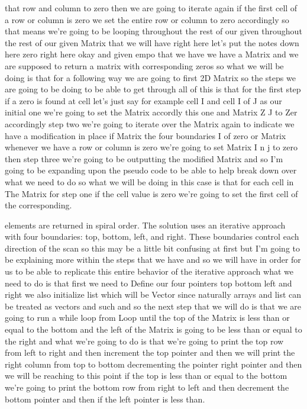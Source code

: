 \expandafter\def\csname sourceexcerpt@58\endcsname{%
that row and column to zero then we are going to iterate again if the first cell of a
row or column is zero we set the entire row or column to zero accordingly so that
means we're going to be looping throughout the rest of our given throughout the rest
of our given Matrix that we will have right here let's put the notes down here zero
right here okay and given empo that we have we have a Matrix and we are supposed to
return a matrix with corresponding zeros so what we will be doing is that for a
following way we are going to first 2D Matrix so the steps we are going to be doing to
be able to get through all of this is that for the first step if a zero is found at
cell let's just say for example cell I and cell I of J as our initial one we're going
to set the Matrix accordly this one and Matrix Z J to Zer accordingly step two we're
going to iterate over the Matrix again to indicate we have a modification in place if
Matrix the four boundaries I of zero or Matrix whenever we have a row or column is zero we're
going to set Matrix I n j to zero then step three we're going to be outputting the
modified Matrix and so I'm going to be expanding upon the pseudo code to be able to
help break down over what we need to do so what we will be doing in this case is that
for each cell in The Matrix for step one if the cell value is zero we're going to set
the first cell of the corresponding.
}

\expandafter\def\csname sourceexcerpt@59\endcsname{%
elements are returned in spiral order. The solution uses an iterative approach with
four boundaries: top, bottom, left, and right. These boundaries control each direction
of the scan
so this may be a little bit confusing at first but I'm going to be explaining more
within the steps that we have and so we will have in order for us to be able to
replicate this entire behavior of the iterative approach what we need to do is that
first we need to Define our four pointers top bottom left and right we also initialize
list which will be Vector since naturally arrays and list can be treated as vectors
and such and so the next step that we will do is that we are going to run a while loop
from Loop until the top of the Matrix is less than or equal to the bottom and the left
of the Matrix is going to be less than or equal to the right and what we're going to
do is that we're going to print the top row from left to right and then increment the
top pointer and then we will print the right column from top to bottom decrementing
the pointer right pointer and then we will be reaching to this point if the top is
less than or equal to the bottom we're going to print the bottom row from right to
left and then decrement the bottom pointer and then if the left pointer is less than.
}

